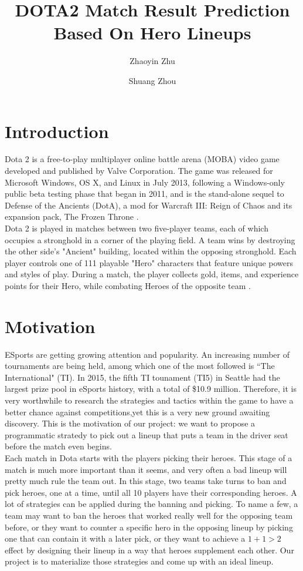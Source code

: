 \documentclass[11pt]{article}
\title{DOTA2 Match Result Prediction Based On Hero Lineups}
\author[1]{Zhaoyin Zhu}
\author[2]{Shuang Zhou}
\affil[1]{Department of Biostatistics, New York University}
\affil[2]{Department of Computer Science, New York University}
\begin{document}
\maketitle

\section{Introduction}
Dota 2 is a free-to-play multiplayer online battle arena (MOBA) video game developed and published by Valve Corporation. The game was released for Microsoft Windows, OS X, and Linux in July 2013, following a Windows-only public beta testing phase that began in 2011, and is the stand-alone sequel to Defense of the Ancients (DotA), a mod for Warcraft III: Reign of Chaos and its expansion pack, The Frozen Throne \cite{dota2}.\\

\noindent Dota 2 is played in matches between two five-player teams, each of which occupies a stronghold in a corner of the playing field. A team wins by destroying the other side's "Ancient" building, located within the opposing stronghold. Each player controls one of 111 playable "Hero" characters that feature unique powers and styles of play. During a match, the player collects gold, items, and experience points for their Hero, while combating Heroes of the opposite team \cite{dota2}.

\section{Motivation}
ESports are getting growing attention and popularity. An increasing number of tournaments are being held, among which one of the most followed is ``The International" (TI). In 2015, the fifth TI tounament (TI5) in Seattle had the largest prize pool in eSports history, with a total of \$10.9 million. Therefore, it is very worthwhile to research the strategies and tactics within the game to have a better chance against competitions,yet this is a very new ground awaiting discovery. This is the motivation of our project: we want to propose a programmatic stratedy to pick out a lineup that puts a team in the driver seat before the match even begins.\\

\noindent Each match in Dota starts with the players picking their heroes. This stage of a match is much more important than it seems, and very often a bad lineup will pretty much rule the team out. In this stage, two teams take turns to ban and pick heroes, one at a time, until all 10 players have their corresponding heroes. A lot of strategies can be applied during the banning and picking. To name a few, a team may want to ban the heroes that worked really well for the opposing team before, or they want to counter a specific hero in the opposing lineup by picking one that can contain it with a later pick, or they want to achieve a $1+1>2$ effect by designing their lineup in a way that heroes supplement each other. Our project is to materialize those strategies and come up with an ideal lineup.
\end{document}
